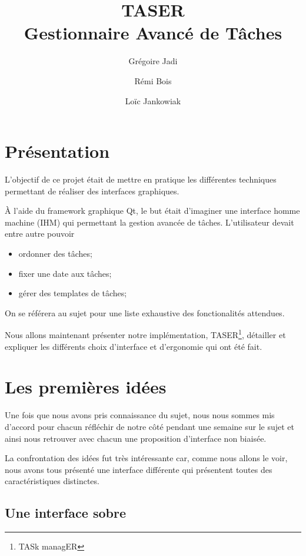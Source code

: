 \documentclass[11pt]{article}
\author{Grégoire Jadi \and{} Rémi Bois \and{} Loïc Jankowiak}
\title{TASER \\
Gestionnaire Avancé de Tâches}
\begin{document}
\maketitle
\tableofcontents


\section{Présentation}

L'objectif de ce projet était de mettre en pratique les différentes
techniques permettant de réaliser des interfaces graphiques.

À l'aide du framework graphique Qt, le but était d'imaginer une
interface homme machine (IHM) qui permettant la gestion avancée de
tâches. L'utilisateur devait entre autre pouvoir
\begin{itemize}
\item ordonner des tâches;
\item fixer une date aux tâches;
\item gérer des templates de tâches;
\end{itemize}
On se référera au sujet pour une liste exhaustive des fonctionalités
attendues.

Nous allons maintenant présenter notre implémentation,
TASER\footnote{TASk managER}, détailler et expliquer les différents
choix d'interface et d'ergonomie qui ont été fait.


\section{Les premières idées}

Une fois que nous avons pris connaissance du sujet, nous nous sommes
mis d'accord pour chacun réfléchir de notre côté pendant une semaine
sur le sujet et ainsi nous retrouver avec chacun une proposition
d'interface non biaisée.

La confrontation des idées fut très intéressante car, comme nous
allons le voir, nous avons tous présenté une interface différente qui
présentent toutes des caractéristiques distinctes.



\subsection{Une interface sobre}

\end{document}
